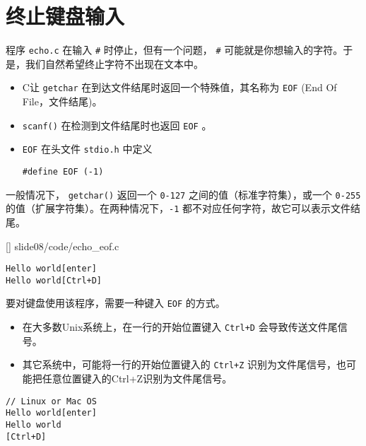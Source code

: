 \section{终止键盘输入}

\begin{frame}[fragile]\ft{\secname}
程序 \lstinline|echo.c| 在输入 \lstinline|#| 时停止，但有一个问题， \lstinline|#| 可能就是你想输入的字符。于是，我们自然希望终止字符不出现在文本中。
\end{frame}

\begin{frame}[fragile]
\begin{itemize}
\item 
C让 \lstinline|getchar| 在到达文件结尾时返回一个特殊值，其名称为 \lstinline|EOF| (End Of File，文件结尾)。\\[0.1in]
\item
\lstinline|scanf()| 在检测到文件结尾时也返回 \lstinline|EOF| 。\\[0.1in]
\item  \lstinline|EOF| 在头文件 \lstinline|stdio.h| 中定义
\begin{lstlisting}
#define EOF (-1)
\end{lstlisting}
\end{itemize}
\end{frame}

\begin{frame}[fragile]
一般情况下， \lstinline|getchar()| 返回一个 \lstinline|0-127| 之间的值（标准字符集），或一个 \lstinline|0-255| 的值（扩展字符集）。在两种情况下，\lstinline|-1| 都不对应任何字符，故它可以表示文件结尾。
\end{frame}

\begin{frame}[fragile]

[]
{slide08/code/echo_eof.c}
\end{frame}

\begin{frame}[fragile]
\begin{lstlisting}
Hello world[enter]
Hello world[Ctrl+D]
\end{lstlisting}
\end{frame}

\begin{frame}[fragile]
要对键盘使用该程序，需要一种键入 \lstinline|EOF| 的方式。\vspace{.1in}

\begin{itemize}
\item 在大多数Unix系统上，在一行的开始位置键入 \lstinline|Ctrl+D| 会导致传送文件尾信号。\\[0.1in]
\item 其它系统中，可能将一行的开始位置键入的 \lstinline|Ctrl+Z| 识别为文件尾信号，也可能把任意位置键入的Ctrl+Z识别为文件尾信号。
\end{itemize}
\end{frame}

\begin{frame}[fragile]
  \begin{lstlisting}[backgroundcolor=\color{blue!20}]
// Linux or Mac OS    
Hello world[enter]
Hello world
[Ctrl+D]
\end{lstlisting}
\end{frame}
